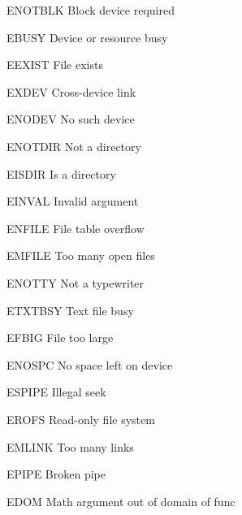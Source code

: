 \begin{datadesc}{ENOTBLK} Block device required \end{datadesc}
\begin{datadesc}{EBUSY} Device or resource busy \end{datadesc}
\begin{datadesc}{EEXIST} File exists \end{datadesc}
\begin{datadesc}{EXDEV} Cross-device link \end{datadesc}
\begin{datadesc}{ENODEV} No such device \end{datadesc}
\begin{datadesc}{ENOTDIR} Not a directory \end{datadesc}
\begin{datadesc}{EISDIR} Is a directory \end{datadesc}
\begin{datadesc}{EINVAL} Invalid argument \end{datadesc}
\begin{datadesc}{ENFILE} File table overflow \end{datadesc}
\begin{datadesc}{EMFILE} Too many open files \end{datadesc}
\begin{datadesc}{ENOTTY} Not a typewriter \end{datadesc}
\begin{datadesc}{ETXTBSY} Text file busy \end{datadesc}
\begin{datadesc}{EFBIG} File too large \end{datadesc}
\begin{datadesc}{ENOSPC} No space left on device \end{datadesc}
\begin{datadesc}{ESPIPE} Illegal seek \end{datadesc}
\begin{datadesc}{EROFS} Read-only file system \end{datadesc}
\begin{datadesc}{EMLINK} Too many links \end{datadesc}
\begin{datadesc}{EPIPE} Broken pipe \end{datadesc}
\begin{datadesc}{EDOM} Math argument out of domain of func \end{datadesc}

